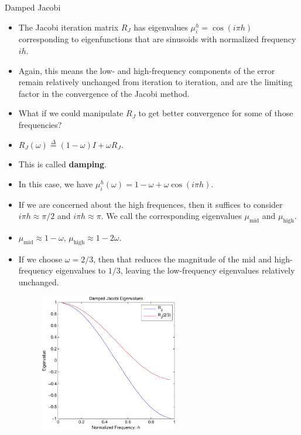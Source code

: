 \documentclass{beamer}
\providecommand{\defeq}{\stackrel{\Delta}{=}}
\begin{document}
\begin{frame}[allowframebreaks]{Damped Jacobi}
 \begin{itemize}
  \item The Jacobi iteration matrix $R_J$ has eigenvalues
        $\mu_i^h = \cos(i \pi h)$ corresponding to eigenfunctions that are
        sinusoids with normalized frequency $ih$.
  \item Again, this means the low- and high-frequency components of the error
        remain relatively unchanged from iteration to iteration, and are the
        limiting factor in the convergence of the Jacobi method.
  \item What if we could manipulate $R_J$ to get better convergence for some
        of those frequencies?
  \item $R_J(\omega) \defeq (1-\omega) I + \omega R_J$.
  \item This is called \textbf{damping}.
  \item In this case, we have $\mu_i^h(\omega) = 1 - \omega + \omega \cos(i \pi h)$.
  \item If we are concerned about the high frequences, then it suffices to
        consider $i \pi h \approx \pi/2$ and $i \pi h \approx \pi$. We call the corresponding
        eigenvalues $\mu_\text{mid}$ and $\mu_\text{high}$.
  \item $\mu_\text{mid} \approx 1-\omega$, $\mu_\text{high} \approx 1-2\omega$.
  \item If we choose $\omega=2/3$, then that reduces the magnitude of the mid
        and high-frequency eigenvalues to $1/3$, leaving the low-frequency
        eigenvalues relatively unchanged.
  \begin{figure}
   \includegraphics[width=6cm]{images/dampedJacobi.pdf}
  \end{figure}
 \end{itemize}
\end{frame}
\end{document}
